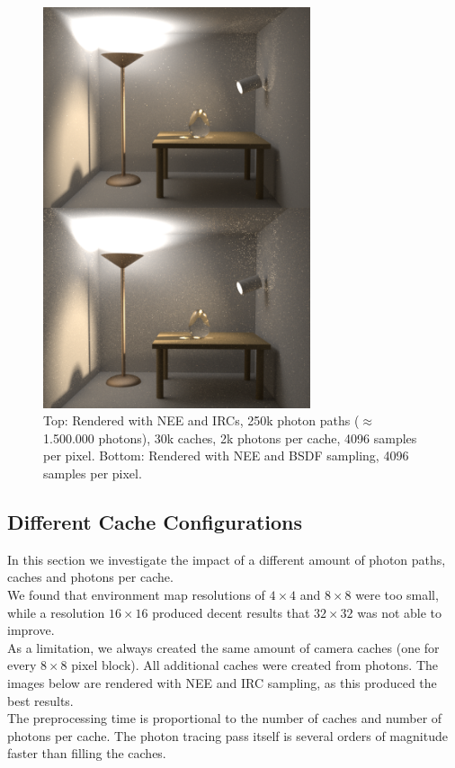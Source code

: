  \begin{figure}[h!]
 \centering
 \includegraphics[width=0.7\textwidth]{bilder/bidir/vergleich.png}
\caption{Top: Rendered with NEE and IRCs, 250k photon paths ($\approx$ 1.500.000 photons), 30k caches, 2k photons per cache, 4096 samples per pixel.\newline
Bottom: Rendered with NEE and BSDF sampling, 4096 samples per pixel.}
  \label{bidir_ircs}\end{figure}



\clearpage



\subsection{Different Cache Configurations}\label{dcc}
In this section we investigate the impact of a different amount of photon paths, caches and photons per cache.\\
We found that environment map resolutions of $4\times 4$ and $8\times 8$ were too small, while a resolution $16\times 16$ produced decent results that $32\times 32$ was not able to improve.\\
As a limitation, we always created the same amount of camera caches (one for every $8\times 8$ pixel block). All additional caches were created from photons. The images below are rendered with NEE and IRC sampling, as this produced the best results.\\
The preprocessing time is proportional to the number of caches and number of photons per cache. The photon tracing pass itself is several orders of magnitude faster than filling the caches.



